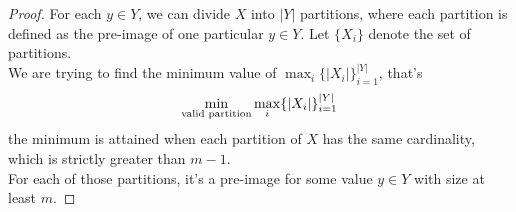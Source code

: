 \documentclass{article}
\begin{document}
			\begin{theorem}
				\begin{proof}
					For each $y \in Y$, we can divide $X$ into $|Y|$ partitions, where each partition is defined as the pre-image of one particular $y \in Y$. Let $\{X_i\}$ denote the set of partitions. \\
					We are trying to find the minimum value of $\max_i\{|X_i|\}_{i=1}^{|Y|}$, that's
					\begin{equation}
						\min_{\text{{valid partition}}} \max_i\{|X_i|\}_{i=1}^{|Y|}
					\end{equation}
					the minimum is attained when each partition of $X$ has the same cardinality, which is strictly greater than $m-1$. \\
					For each of those partitions, it's a pre-image for some value $y \in Y$ with size at least $m$.
				\end{proof}
			\end{theorem}
			
\end{document}
